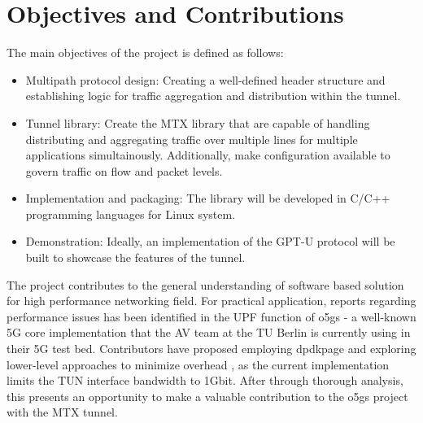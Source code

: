 \section{Objectives and Contributions}
The main objectives of the project is defined as follows:
\begin{itemize}
    \item Multipath protocol design: Creating a well-defined header structure and establishing logic for traffic aggregation and distribution within the tunnel.
    \item Tunnel library: Create the MTX library that are capable of handling distributing and aggregating traffic over multiple lines for multiple applications simultainously. 
    Additionally, make configuration available to govern traffic on flow and packet levels.
    \item Implementation and packaging: The library will be developed in C/C++ programming languages for Linux system.
    \item Demonstration: Ideally, an implementation of the GPT-U protocol will be built to showcase the features of the tunnel.
\end{itemize}

The project contributes to the general understanding of software based solution for high performance networking field.
For practical application, reports regarding performance issues has been identified in the \ac{UPF} function of \ac{o5gs} - a well-known 5G core implementation that the AV team at the TU Berlin is currently using in their 5G test bed. 
Contributors have proposed employing \ac{dpdkpage} and exploring lower-level approaches to minimize overhead \cite{open5gs_github_udp_perf_cap}\cite{open5gs_github_dpdk}, as the current implementation limits the TUN interface bandwidth to 1Gbit. 
After through thorough analysis, this presents an opportunity to make a valuable contribution to the \ac{o5gs} project with the MTX tunnel.


